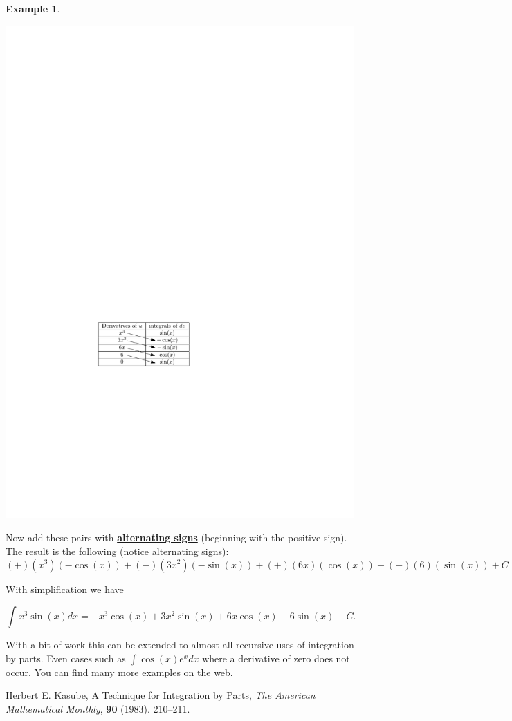 \documentclass[reqno]{amsart}
\theoremstyle{definition}
\newtheorem{eg}{Example}
\numberwithin{equation}{section}
\begin{document}
\begin{eg}
\begin{center}
\includegraphics[scale=1]{TabEg}
\end{center}
Now add these pairs with \underline{{\bf alternating signs}} (beginning with the positive sign).  The result is the following (notice alternating signs):
\[ (+)(x^3)(-\cos(x))+(-)(3x^2)(-\sin(x))+(+)(6x)(\cos(x))+(-)(6)(\sin(x))+C \]

With simplification we have

\[ \int x^3 \sin(x) dx = -x^3\cos(x)+3x^2\sin(x)+6x\cos(x)-6\sin(x)+C. \]
\end{eg}

With a bit of work this can be extended to almost all recursive uses of integration by parts.  Even cases such as $\int \cos(x) e^x dx$ where a derivative of zero does not occur.  You can find many more examples on the web. 

\begin{thebibliography}{19}
 Herbert E. Kasube, A Technique for Integration by Parts, \emph{The American Mathematical Monthly},  {\bf 90} (1983). 210--211.
 

\end{thebibliography}
\end{document}
